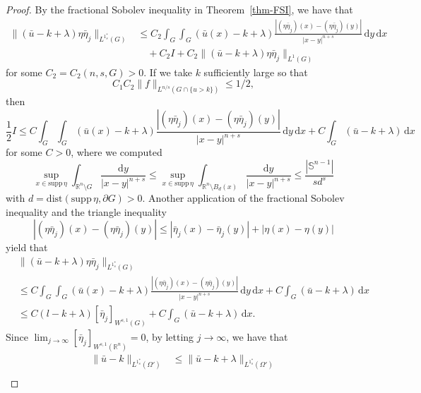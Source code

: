 \documentclass[10pt,a4paper]{amsart}
\begin{document}
\begin{proof}
By the fractional Sobolev inequality in Theorem~\ref{thm-FSI}, we have that
\begin{align*}
\|(\bar{u}-k+\lambda)\eta\bar{\eta}_j\|_{L^{1^{\ast}_s}(G)}
&\leq C_2 \int_{G} \int_{G} (\bar{u}(x)-k+\lambda) \frac{|(\eta\bar{\eta}_j)(x)-(\eta\bar{\eta}_j)(y)|}{|x-y|^{n+s}} \,\mathrm{d}y \,\mathrm{d}x \\
&\quad + C_2 I + C_2 \|(\bar{u}-k+\lambda)\eta\bar{\eta}_j\|_{L^1(G)}
\end{align*}
for some $C_2=C_2(n, s, G)>0$. If we take $k$ sufficiently large so that
\begin{equation}\label{eq-k}
C_1C_2 \|f\|_{L^{n/s}(G \cap \{u>k\})} \leq 1/2,
\end{equation}
then
\begin{equation*}
\frac{1}{2} I \leq C \int_{G} \int_{G} (\bar{u}(x)-k+\lambda) \frac{|(\eta\bar{\eta}_j)(x)-(\eta\bar{\eta}_j)(y)|}{|x-y|^{n+s}} \,\mathrm{d}y \,\mathrm{d}x + C \int_G (\bar{u}-k+\lambda) \,\mathrm{d}x
\end{equation*}
for some $C>0$, where we computed
\begin{equation*}
\sup_{x \in \mathrm{supp}\,\eta} \int_{\mathbb{R}^n \setminus G} \frac{\mathrm{d}y}{|x-y|^{n+s}} \leq \sup_{x \in \mathrm{supp}\,\eta} \int_{\mathbb{R}^n \setminus B_d(x)} \frac{\mathrm{d}y}{|x-y|^{n+s}} \leq \frac{|\mathbb{S}^{n-1}|}{s d^s}
\end{equation*}
with $d=\mathrm{dist}(\mathrm{supp}\,\eta, \partial G)>0$. Another application of the fractional Sobolev inequality and the triangle inequality
\begin{equation*}
|(\eta\bar{\eta}_j)(x)-(\eta\bar{\eta}_j)(y)| \leq |\bar{\eta}_j(x)-\bar{\eta}_j(y)| + |\eta(x)-\eta(y)|
\end{equation*}
yield that
\begin{align*}
&\|(\bar{u}-k+\lambda)\eta\bar{\eta}_j\|_{L^{1^{\ast}_s}(G)} \\
&\leq C \int_{G} \int_{G} (\bar{u}(x)-k+\lambda) \frac{|(\eta\bar{\eta}_j)(x)-(\eta\bar{\eta}_j)(y)|}{|x-y|^{n+s}} \,\mathrm{d}y \,\mathrm{d}x + C \int_{G} (\bar{u}-k+\lambda) \,\mathrm{d}x \\
&\leq C (l-k+\lambda) [\bar{\eta}_j]_{W^{s, 1}(G)} + C \int_{G} (\bar{u}-k+\lambda) \,\mathrm{d}x.
\end{align*}
Since $\lim_{j\to \infty} [\bar{\eta}_j]_{W^{s,1}(\mathbb{R}^n)} = 0$, by letting $j \to \infty$, we have that
\begin{align*}
\|\bar{u}-k\|_{L^{1^{\ast}_s}(\Omega')}
&\leq \|\bar{u}-k+\lambda\|_{L^{1^{\ast}_s}(\Omega')} \\

\end{align*}
\end{proof}
\end{document}
